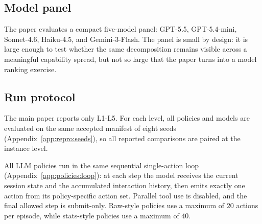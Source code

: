 \subsection{Model panel}

The paper evaluates a compact five-model panel: GPT-5.5, GPT-5.4-mini, Sonnet-4.6, Haiku-4.5, and Gemini-3-Flash. The panel is small by design: it is large enough to test whether the same decomposition remains visible across a meaningful capability spread, but not so large that the paper turns into a model ranking exercise.

\subsection{Run protocol}

The main paper reports only L1-L5. For each level, all policies and models are evaluated on the same accepted manifest of eight seeds (Appendix~\ref{app:repro:seeds}), so all reported comparisons are paired at the instance level.

All LLM policies run in the same sequential single-action loop (Appendix~\ref{app:policies:loop}): at each step the model receives the current session state and the accumulated interaction history, then emits exactly one action from its policy-specific action set. Parallel tool use is disabled, and the final allowed step is submit-only. Raw-style policies use a maximum of $20$ actions per episode, while stats-style policies use a maximum of $40$.
